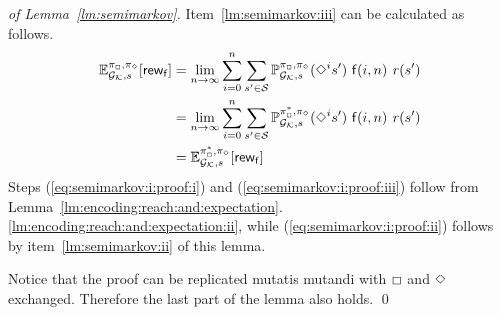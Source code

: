 \begin{proof}[of Lemma~\ref{lm:semimarkov}]
  \medskip
  
  Item~\ref{lm:semimarkov:iii} can be calculated as follows.
  \begin{align}
    \mathbb{E}^{\pi_{{\Box}},\pi_{{\Diamond}}}_{{\mathcal{G}_{\mathcal{K}}},s}[\mathsf{rew}_{\mathsf{f}}]
    & =
    \lim_{n\to\infty} \sum^{n}_{i=0} \sum_{s' \in \mathcal{S}} \mathbb{P}^{\pi_{{\Box}},\pi_{{\Diamond}}}_{{\mathcal{G}_{\mathcal{K}}},s}(\Diamond^i s')\ \mathsf{f}(i,n)\ \mathit{r}(s')
    \label{eq:semimarkov:i:proof:i}\\
    & =
    \lim_{n\to\infty} \sum^{n}_{i=0} \sum_{s' \in \mathcal{S}} \mathbb{P}^{\pi^*_{{\Box}},\pi_{{\Diamond}}}_{{\mathcal{G}_{\mathcal{K}}},s}(\Diamond^i s')\ \mathsf{f}(i,n)\ \mathit{r}(s')
    \label{eq:semimarkov:i:proof:ii}\\
    & =
    \mathbb{E}^{\pi^*_{{\Box}},\pi_{{\Diamond}}}_{{\mathcal{G}_{\mathcal{K}}},s}[\mathsf{rew}_{\mathsf{f}}]
    \label{eq:semimarkov:i:proof:iii}
  \end{align}
  Steps (\ref{eq:semimarkov:i:proof:i}) and
  (\ref{eq:semimarkov:i:proof:iii}) follow from
  Lemma~\ref{lm:encoding:reach:and:expectation}.\ref{lm:encoding:reach:and:expectation:ii},
  while (\ref{eq:semimarkov:i:proof:ii}) follows by
  item~\ref{lm:semimarkov:ii} of this lemma.

  \medskip
  
  Notice that the proof can be replicated mutatis mutandi with
  ${\Box}$ and ${\Diamond}$ exchanged.  Therefore the last part of the
  lemma also holds.
\qed
\end{proof}


